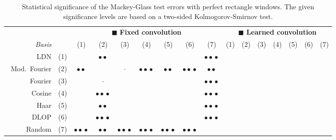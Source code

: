 \begin{table}[p]
	\newcommand{\sigA}{\ensuremath{\cdot}}
	\newcommand{\sigB}{\ensuremath{\bullet\bullet}}
	\newcommand{\sigC}{\ensuremath{\bullet\!\bullet\!\bullet}}
	\caption[Statistical significance of the Mackey-Glass test errors with perfect rectangle windows]{Statistical significance of the Mackey-Glass test errors with perfect rectangle windows. The given significance levels are based on a two-sided Kolmogorov-Smirnov test.}
	\label{tbl:mackey_glass_ne_significance}
	\centering\small\sffamily
	\setlength{\tabcolsep}{6.2pt}
	\begin{tabular}{r r  c c c c c c c  c c c c c c c}
	\toprule
	& & \multicolumn{7}{c}{{\color{skyblue1}$\blacksquare$} \textbf{Fixed convolution}}
	& \multicolumn{7}{c}{{\color{aluminium2}$\blacksquare$} \textbf{Learned convolution}} \\
	\cmidrule(r){3-9}\cmidrule(l){10-16}
	\emph{Basis} & & (1) & (2) & (3) & (4) & (5) & (6) & (7)  & (1) & (2) & (3) & (4) & (5) & (6) & (7) \\
	\midrule
	\symLTI~LDN & (1) &
	 &
	\sigB &
	 &
	 &
	 &
	 &
	\sigC &
	 &
	 &
	 &
	 &
	 &
	 &
	 \\
	\symLTI~Mod.~Fourier & (2) &
	\sigB &
	 &
	\sigA &
	\sigC &
	\sigB &
	\sigC &
	\sigB &
	 &
	 &
	 &
	 &
	 &
	 &
	 \\
	\symSDT~Fourier & (3) &
	 &
	\sigA &
	 &
	 &
	 &
	 &
	\sigC &
	 &
	 &
	 &
	 &
	 &
	 &
	 \\
	\symSDT~Cosine & (4) &
	 &
	\sigC &
	 &
	 &
	 &
	 &
	\sigC &
	 &
	 &
	 &
	 &
	 &
	 &
	 \\
	\symSDT~Haar & (5) &
	 &
	\sigB &
	 &
	 &
	 &
	 &
	\sigC &
	 &
	 &
	 &
	 &
	 &
	 &
	 \\
	\symFIR~DLOP & (6) &
	 &
	\sigC &
	 &
	 &
	 &
	 &
	\sigC &
	 &
	 &
	 &
	 &
	 &
	 &
	 \\
	\symFIR~Random & (7) &
	\sigC &
	\sigB &
	\sigC &
	\sigC &
	\sigC &
	\sigC &
	 &
	 &
	 &
	 &
	 &
	 &
	 &
	 \\
	\bottomrule
	\end{tabular}
\end{table}
